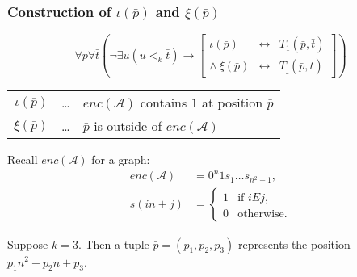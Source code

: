 \documentclass{beamer}
\newcommand{\A}{\mathcal{A}}
\begin{document}
\begin{frame}
	\frametitle{Construction of $ι(\bar{p})$ and $ξ(\bar{p})$}
	\begin{equation*}
		∀\bar{p}∀\bar{t}\left(¬∃\bar{u} (\bar{u} <_k \bar{t}) → \left[
		\begin{array}{rcl}
		ι(\bar{p})&\leftrightarrow&T_1(\bar{p},\bar{t})\\
		∧\ ξ(\bar{p})&\leftrightarrow&T_{\_}(\bar{p},\bar{t})
		\end{array}		
	\right]\right)
	\end{equation*}
	\begin{tabular}{rcl}
	$ι(\bar{p})$ &…& $enc(\A)$ contains $1$ at position $\bar{p}$\\
	$ξ(\bar{p})$ &…& $\bar{p}$ is outside of $enc(\A)$
	\end{tabular}
	
	Recall $enc(\A)$ for a graph:
	\begin{align*}
	 enc(\A) &= 0^n1s_1…s_{n^2-1},\\
	 s(in+j) &= \begin{cases} 1 &\text{if } i E j,\\ 0 &\text{otherwise.}\end{cases}
	\end{align*}

	Suppose $k = 3$. Then a tuple $\bar{p} = (p_1,p_2,p_3)$ represents the position $p_1 n^2 + p_2 n + p_3$.
\end{frame}
\end{document}
